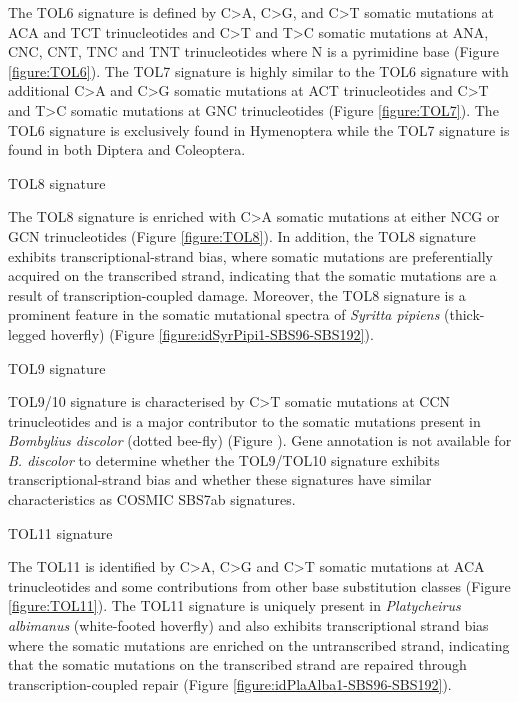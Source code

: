 The TOL6 signature is defined by C>A, C>G, and C>T somatic mutations at ACA and TCT trinucleotides and C>T and T>C somatic mutations at ANA, CNC, CNT, TNC and TNT trinucleotides where N is a pyrimidine base (Figure \ref{figure:TOL6}). The TOL7 signature is highly similar to the TOL6 signature with additional C>A and C>G somatic mutations at ACT trinucleotides and C>T and T>C somatic mutations at GNC trinucleotides (Figure \ref{figure:TOL7}). The TOL6 signature is exclusively found in Hymenoptera while the TOL7 signature is found in both Diptera and Coleoptera. 

\begin{description}
    \item[TOL8 signature]
\end{description}

The TOL8 signature is enriched with C>A somatic mutations at either NCG or GCN trinucleotides (Figure \ref{figure:TOL8}). In addition, the TOL8 signature exhibits transcriptional-strand bias, where somatic mutations are preferentially acquired on the transcribed strand, indicating that the somatic mutations are a result of transcription-coupled damage. Moreover, the TOL8 signature is a prominent feature in the somatic mutational spectra of \textit{Syritta pipiens} (thick-legged hoverfly) (Figure \ref{figure:idSyrPipi1-SBS96-SBS192}).

\pagebreak

\begin{description}
    \item[TOL9 signature]
\end{description}

TOL9/10 signature is characterised by C>T somatic mutations at CCN trinucleotides and is a major contributor to the somatic mutations present in \textit{Bombylius discolor} (dotted bee-fly) (Figure ). Gene annotation is not available for \textit{B. discolor} to determine whether the TOL9/TOL10 signature exhibits transcriptional-strand bias and whether these signatures have similar characteristics as COSMIC SBS7ab signatures. 

\begin{description}
    \item[TOL11 signature]
\end{description}

The TOL11 is identified by C>A, C>G and C>T somatic mutations at ACA trinucleotides and some contributions from other base substitution classes (Figure \ref{figure:TOL11}). The TOL11 signature is uniquely present in \textit{Platycheirus albimanus} (white-footed hoverfly) and also exhibits transcriptional strand bias where the somatic mutations are enriched on the untranscribed strand, indicating that the somatic mutations on the transcribed strand are repaired through transcription-coupled repair (Figure \ref{figure:idPlaAlba1-SBS96-SBS192}). 

